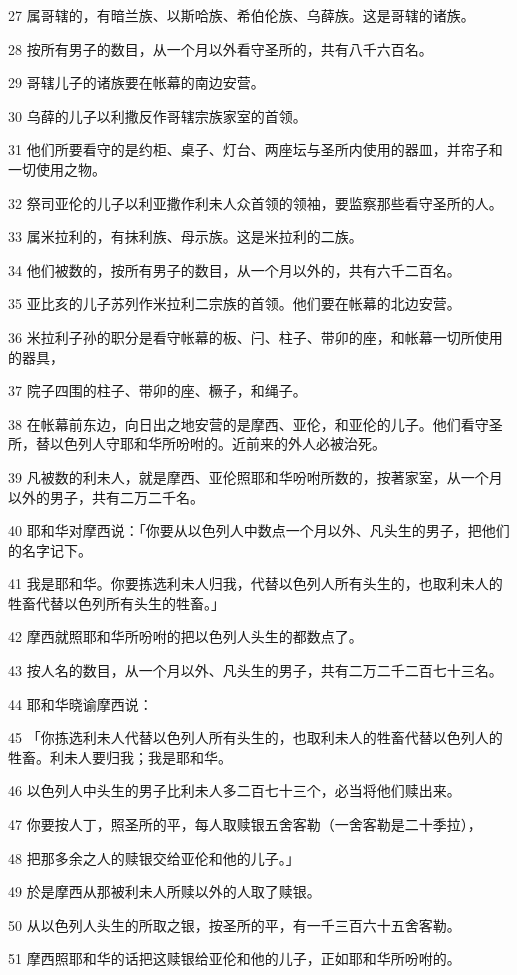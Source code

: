 \par 27 属哥辖的，有暗兰族、以斯哈族、希伯伦族、乌薛族。这是哥辖的诸族。
\par 28 按所有男子的数目，从一个月以外看守圣所的，共有八千六百名。
\par 29 哥辖儿子的诸族要在帐幕的南边安营。
\par 30 乌薛的儿子以利撒反作哥辖宗族家室的首领。
\par 31 他们所要看守的是约柜、桌子、灯台、两座坛与圣所内使用的器皿，并帘子和一切使用之物。
\par 32 祭司亚伦的儿子以利亚撒作利未人众首领的领袖，要监察那些看守圣所的人。
\par 33 属米拉利的，有抹利族、母示族。这是米拉利的二族。
\par 34 他们被数的，按所有男子的数目，从一个月以外的，共有六千二百名。
\par 35 亚比亥的儿子苏列作米拉利二宗族的首领。他们要在帐幕的北边安营。
\par 36 米拉利子孙的职分是看守帐幕的板、闩、柱子、带卯的座，和帐幕一切所使用的器具，
\par 37 院子四围的柱子、带卯的座、橛子，和绳子。
\par 38 在帐幕前东边，向日出之地安营的是摩西、亚伦，和亚伦的儿子。他们看守圣所，替以色列人守耶和华所吩咐的。近前来的外人必被治死。
\par 39 凡被数的利未人，就是摩西、亚伦照耶和华吩咐所数的，按著家室，从一个月以外的男子，共有二万二千名。
\par 40 耶和华对摩西说：「你要从以色列人中数点一个月以外、凡头生的男子，把他们的名字记下。
\par 41 我是耶和华。你要拣选利未人归我，代替以色列人所有头生的，也取利未人的牲畜代替以色列所有头生的牲畜。」
\par 42 摩西就照耶和华所吩咐的把以色列人头生的都数点了。
\par 43 按人名的数目，从一个月以外、凡头生的男子，共有二万二千二百七十三名。
\par 44 耶和华晓谕摩西说：
\par 45 「你拣选利未人代替以色列人所有头生的，也取利未人的牲畜代替以色列人的牲畜。利未人要归我；我是耶和华。
\par 46 以色列人中头生的男子比利未人多二百七十三个，必当将他们赎出来。
\par 47 你要按人丁，照圣所的平，每人取赎银五舍客勒（一舍客勒是二十季拉），
\par 48 把那多余之人的赎银交给亚伦和他的儿子。」
\par 49 於是摩西从那被利未人所赎以外的人取了赎银。
\par 50 从以色列人头生的所取之银，按圣所的平，有一千三百六十五舍客勒。
\par 51 摩西照耶和华的话把这赎银给亚伦和他的儿子，正如耶和华所吩咐的。

